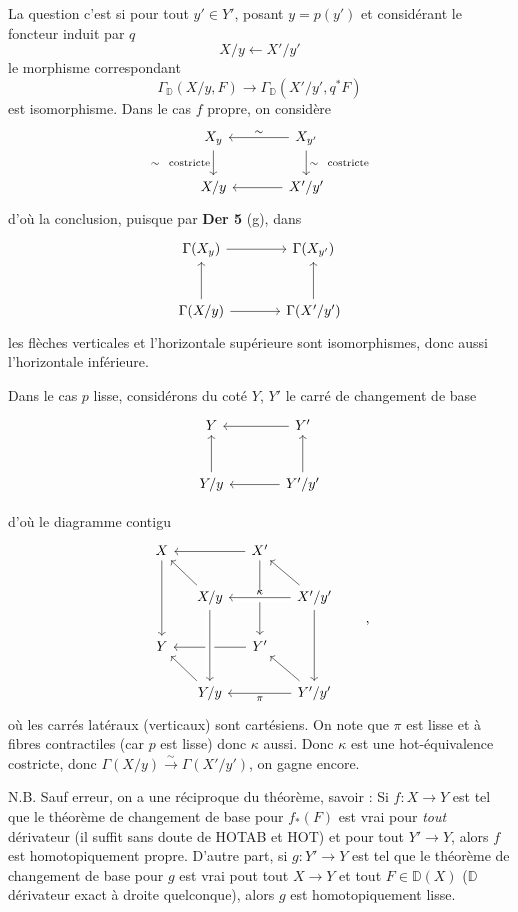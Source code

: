\documentclass[11pt]{article}
\newcommand{\printedpage}[1]{\marginpar{\footnotesize p.~#1}}
\newcommand{\msp}[1]{\marginpar{\footnotesize [#1]}}
\newcommand{\DD}{\mathbb{D}}
\begin{document}
\noindent\msp{page 57}
La question c'est si pour tout $y' \in Y'$, posant $y = p(y')$ et considérant le foncteur induit par $q$
\[
X/y \longleftarrow X'/y'
\]
le morphisme correspondant
\[
\Gamma_{\DD}(X/y, F) \longrightarrow \Gamma_{\DD}(X'/y', q^*F)
\]
est isomorphisme. Dans le cas $f$ propre, on considère
\[
\begin{tikzcd}[column sep=large]
X_y \arrow[d, "\sim\ \ \text{costricte}"'] & X_{y'} \arrow[l, "\sim"'] \arrow[d, "\sim\ \ \text{costricte}"] \\
X/y & X'/y' \arrow[l]
\end{tikzcd}
\]
d'où la conclusion, puisque par \textbf{Der 5} (g), dans
\[
\begin{tikzcd}[row sep=large, column sep=large]
\Gamma(X_y) \arrow[r] & \Gamma(X_{y'}) \\
\Gamma(X/y) \arrow[u] \arrow[r] & \Gamma(X'/y') \arrow[u]
\end{tikzcd}
\]
les flèches verticales et l'horizontale supérieure sont isomorphismes, donc aussi l'horizontale inférieure.

\printedpage{33}

Dans le cas $p$ lisse, considérons du coté $Y$, $Y'$ le carré de changement de base %
\[
\begin{tikzcd}[row sep=large, column sep=large]
Y & Y' \arrow[l] \\
Y/y \arrow[u] & Y'/y' \arrow[l] \arrow[u]
\end{tikzcd}
\]

\noindent\msp{page 58}
d'où le diagramme contigu
\[
\begin{tikzcd}[column sep=small]
X \arrow[dd] & & X' \arrow[ll] \arrow[dd] & \\
& X/y \arrow[ul] & & X'/y' \arrow[ll, crossing over, "\kappa"'] \arrow[ul] \arrow[dd] \\
Y & & Y' \arrow[ll] & \\
& Y/y \arrow[ul] \arrow[from=uu, crossing over] & & Y'/y' \arrow[ll, "\pi"] \arrow[ul]
\end{tikzcd}
\qquad ,
\]
où les carrés latéraux (verticaux) sont cartésiens. On note que $\pi$ est lisse et à fibres contractiles (car $p$ est lisse) donc $\kappa$ aussi. Donc $\kappa$ est une hot-équivalence costricte, donc $\Gamma(X/y) \overset{\sim}{\longrightarrow} \Gamma(X'/y')$, on gagne encore.

\noindent N.B. Sauf erreur, on a une réciproque du théorème, savoir : Si $f : X \to Y$ est tel que le théorème de changement de base pour $f_*(F)$ est vrai pour \textit{tout} dérivateur (il suffit sans doute de \textsf{HOTAB} et \textsf{HOT}) et pour tout $Y' \to Y$, alors $f$ est homotopiquement propre. D'autre part, si $g : Y' \to Y$ est tel que le théorème de changement de base pour $g$ est vrai pout tout $X \to Y$ et tout $F \in \DD(X)$ ($\DD$ dérivateur exact à droite quelconque), alors $g$ est homotopiquement lisse. %
\end{document}
